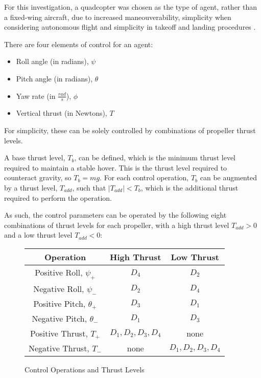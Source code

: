 \documentclass[../report.tex]{subfiles}
\begin{document}
For this investigation, a quadcopter was chosen as the type of agent, rather than a fixed-wing aircraft, due to increased maneouverability, simplicity when considering autonomous flight and simplicity in takeoff and landing procedures \cite{Thamm}.

There are four elements of control for an agent:
\begin{itemize}
    \item Roll angle (in radians), $\psi$
    \item Pitch angle (in radians), $\theta$
    \item Yaw rate (in $\frac{rad}{s}$), $\phi$
    \item Vertical thrust (in Newtons), $T$
\end{itemize}

For simplicity, these can be solely controlled by combinations of propeller thrust levels. 

A base thrust level, $T_b$, can be defined, which is the minimum thrust level required to maintain a stable hover. This is the thrust level required to counteract gravity, so $T_b = mg$. For each control operation, $T_b$ can be augmented by a thrust level, $T_{add}$, such that $|T_{add}| < T_b$, which is the additional thrust required to perform the operation.

As such, the control parameters can be operated by the following eight combinations of thrust levels for each propeller, with a high thrust level $T_{add} > 0$ and a low thrust level $T_{add} < 0$:


\begin{figure}[H]
    \begin{center}
    \begin{tabular}{| c | c | c |} 
    \hline
    Operation & High Thrust & Low Thrust \\ 
    \hline
    Positive Roll, $\psi_+$ & $D_4$ & $D_2$ \\
    \hline
    Negative Roll, $\psi_-$ & $D_2$ & $D_4$ \\
    \hline
    Positive Pitch, $\theta_+$ & $D_3$ & $D_1$ \\
    \hline
    Negative Pitch, $\theta_-$ & $D_1$ & $D_3$ \\
    \hline
    Positive Thrust, $T_+$ & $D_1, D_2, D_3, D_4$ & none \\
    \hline
    Negative Thrust, $T_-$ & none & $D_1, D_2, D_3, D_4$ \\
    \hline
    \end{tabular}
    \end{center}
    \caption{Control Operations and Thrust Levels}
    \label{fig:control}
\end{figure}
\end{document}

